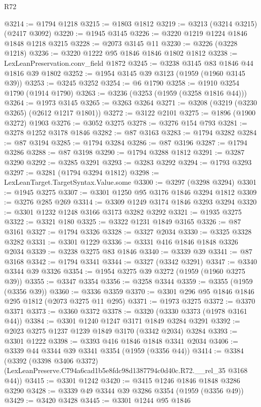 \begin{lexlean}{R72}
\begin{coremodule}
@3214 := @1794 @1218
@3215 := @1803 @1812
@3219 := @3213 (@3214 @3215) (@2417 @3092)
@3220 := @1945 @3145
@3226 := @3220 @1219 @1224 @1846 @1848 @1218 @3215
@3228 := @2073 @3145 @11
@3230 := @3226 (@3228 @1218)
@3236 := @3220 @1222 @95 @1846 @1846 @1802 @1812
@3238 := LexLeanPreservation.conv_field @1872
@3245 := @3238 @3145 @83 @1846 @44 @1816 @39 @1802
@3252 := @1954 @3145 @39 @3123 (@1959 (@1960 @3145 @39))
@3253 := @3245 @3252
@3254 := @6 @1790
@3258 := @1910 @3254 @1790 (@1914 @1790)
@3263 := @3236 (@3253 (@1959 (@3258 @1816 @44)))
@3264 := @1973 @3145
@3265 := @3263 @3264
@3271 := @3208 (@3219 (@3230 @3265) (@2612 @1217 @1801))
@3272 := @3122 @2101
@3275 := @1896 (@1900 @3272) @1903
@3276 := @3052 @3275
@3278 := @3276 @154 @793
@3281 := @3278 @1252 @3178 @1846
@3282 := @87 @3163
@3283 := @1794 @3282
@3284 := @87 @3194
@3285 := @1794 @3284
@3286 := @87 @3196
@3287 := @1794 @3286
@3288 := @87 @3198
@3290 := @1794 @3288 @1812
@3291 := @3287 @3290
@3292 := @3285 @3291
@3293 := @3283 @3292
@3294 := @1793 @3293
@3297 := @3281 (@1794 @3294 @1812)
@3298 := LexLeanTarget.TargetSyntax.Value.some
@3300 := @3297 (@3298 @3294)
@3301 := @1945 @3275
@3307 := @3301 @1250 @95 @3176 @1846 @3294 @1812
@3309 := @3276 @285 @269
@3314 := @3309 @1249 @3174 @1846 @3293 @3294
@3320 := @3301 @1232 @1248 @3166 @3173 @3282 @3292
@3321 := @1935 @3275
@3322 := @3321 @180
@3325 := @3322 @1231 @1849 @3165
@3326 := @87 @3161
@3327 := @1794 @3326
@3328 := @3327 @2034
@3330 := @3325 @3328 @3282
@3331 := @3301 @1229
@3336 := @3331 @416 @1846 @1848 @3326 @2034
@3339 := @3238 @3275 @83 @1846
@3340 := @3339 @39
@3341 := @87 @3168
@3342 := @1794 @3341
@3344 := @3327 (@3342 @3291)
@3347 := @3340 @3344 @39 @3326
@3354 := @1954 @3275 @39 @3272 (@1959 (@1960 @3275 @39))
@3355 := @3347 @3354
@3356 := @3258 @3344
@3359 := @3355 (@1959 (@3356 @39))
@3360 := @3336 @3359
@3370 := @3301 @296 @95 @1846 @1846 @295 @1812 (@2073 @3275 @11 @295)
@3371 := @1973 @3275
@3372 := @3370 @3371
@3373 := @3360 @3372
@3378 := @3320 (@3330 @3373 (@1978 @3161 @44))
@3384 := @3301 @1240 @1247 @3171 @1849 @3284 @3291
@3392 := @2023 @3275 @1237 @1239 @1849 @3170 (@3342 @2034) @3284
@3393 := @3301 @1222
@3398 := @3393 @416 @1846 @1848 @3341 @2034
@3406 := @3339 @44 @3344 @39 @3341 @3354 (@1959 (@3356 @44))
@3414 := @3384
    (@3392
      (@3398 @3406 @3372)
      (LexLeanPreserve.C794a6cad1b5e8fdc98d1387794c0d40c.R72.__rel_35 @3168 @44))
@3415 := @3301 @1242
@3420 := @3415 @1246 @1846 @1848 @3286 @3290
@3428 := @3339 @49 @3344 @39 @3286 @3354 (@1959 (@3356 @49))
@3429 := @3420 @3428
@3445 := @3301
    @1244
    @95
    @1846

\end{coremodule}
\end{lexlean}
